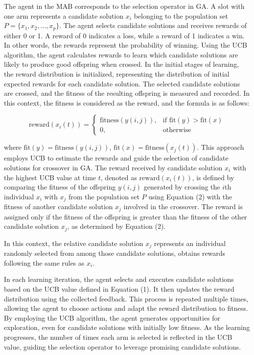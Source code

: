 \documentclass{article}
\begin{document}
The agent in the MAB corresponds to the selection operator in GA. A slot with one arm represents a candidate solution $x_i$ belonging to the population set $P=\{x_1, x_2, \ldots, x_p\}$. The agent selects candidate solutions and receives rewards of either 0 or 1. A reward of 0 indicates a loss, while a reward of 1 indicates a win. In other words, the rewards represent the probability of winning. Using the UCB algorithm, the agent calculates rewards to learn which candidate solutions are likely to produce good offspring when crossed. In the initial stages of learning, the reward distribution is initialized, representing the distribution of initial expected rewards for each candidate solution. The selected candidate solutions are crossed, and the fitness of the resulting offspring is measured and recorded. In this context, the fitness is considered as the reward, and the formula is as follows:

\begin{equation}
\text{reward}(x_i(t)) = \begin{cases}
\text{fitness}(y(i,j)), & \text{if } \text{fit}(y) > \text{fit}(x) \\
0, & \text{otherwise}
\end{cases}
\end{equation}

where $\text{fit}(y) = \text{fitness}(y(i,j))$, $\text{fit}(x) = \text{fitness}(x_j(t))$. This approach employs UCB to estimate the rewards and guide the selection of candidate solutions for crossover in GA. The reward received by candidate solution $x_i$ with the highest UCB value at time $t$, denoted as $\text{reward}(x_i(t))$, is defined by comparing the fitness of the offspring $y(i,j)$ generated by crossing the $i$th individual $x_i$ with $x_j$ from the population set $P$ using Equation (2) with the fitness of another candidate solution $x_j$ involved in the crossover. The reward is assigned only if the fitness of the offspring is greater than the fitness of the other candidate solution $x_j$, as determined by Equation (2).

In this context, the relative candidate solution $x_j$ represents an individual randomly selected from among those candidate solutions, obtains rewards following the same rules as $x_i$.

In each learning iteration, the agent selects and executes candidate solutions based on the UCB value defined in Equation (1). It then updates the reward distribution using the collected feedback. This process is repeated multiple times, allowing the agent to choose actions and adapt the reward distribution to fitness. By employing the UCB algorithm, the agent generates opportunities for exploration, even for candidate solutions with initially low fitness. As the learning progresses, the number of times each arm is selected is reflected in the UCB value, guiding the selection operator to leverage promising candidate solutions.
\end{document}
